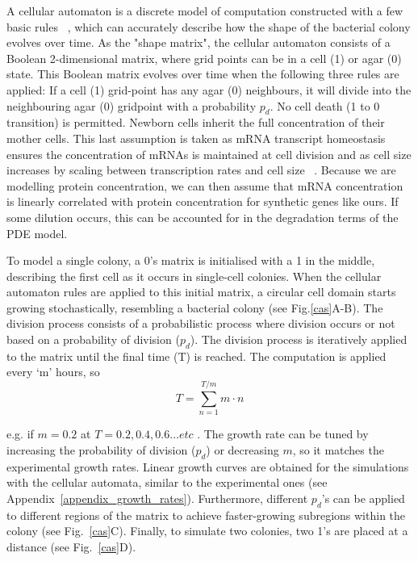 A cellular automaton is a discrete model of computation constructed with a few basic rules ~\parencite{gardner1970mathematical}, which can accurately describe how the shape of the bacterial colony evolves over time.
As the "shape matrix", the cellular automaton consists of a Boolean 2-dimensional matrix, where grid points can be in a cell (1) or agar (0) state.
This Boolean matrix evolves over time when the following three rules are applied: If a cell (1) grid-point has any agar (0) neighbours, it will divide into the neighbouring agar (0) gridpoint with a probability $p_{d}$.
No cell death (1 to 0 transition) is permitted.
Newborn cells inherit the full concentration of their mother cells.
This last assumption is taken as mRNA transcript homeostasis ensures the concentration of mRNAs is maintained at cell division and as cell size increases by scaling between transcription rates and cell size ~\parencite{berry2022mechanisms,volteras2023global}.
Because we are modelling protein concentration, we can then assume that mRNA concentration is linearly correlated with protein concentration for synthetic genes like ours.
If some dilution occurs, this can be accounted for in the degradation terms of the PDE model.

To model a single colony, a 0's matrix is initialised with a 1 in the middle, describing the first cell as it occurs in single-cell colonies.
When the cellular automaton rules are applied to this initial matrix, a circular cell domain starts growing stochastically, resembling a bacterial colony (see Fig.\ref{cas}A-B).
The division process consists of a probabilistic process where division occurs or not based on a probability of division ($p_{d}$).
The division process is iteratively applied to the matrix until the final time (T) is reached.
The computation is applied every ‘m’ hours, so
\begin{equation}
        T = \sum_{n=1}^{T/m} m\cdot n
\end{equation}

e.g. if $m=0.2$ at $T=0.2, 0.4, 0.6 \ldots etc$ .
The growth rate can be tuned by increasing the probability of division ($p_d$) or decreasing $m$, so it matches the experimental growth rates.
Linear growth curves are obtained for the simulations with the cellular automata, similar to the experimental ones (see Appendix~\ref{appendix_growth_rates}).
Furthermore, different $p_d$’s can be applied to different regions of the matrix to achieve faster-growing subregions within the colony (see Fig.~\ref{cas}C).
Finally, to simulate two colonies, two 1’s are placed at a distance (see Fig.~\ref{cas}D).

